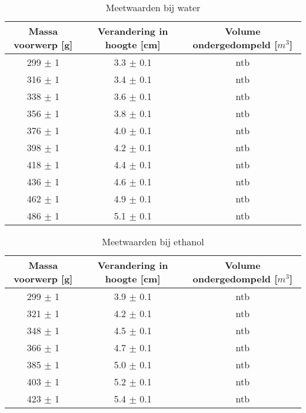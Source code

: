\documentclass[10pt,a4paper,twoside]{article}
\begin{document}
\begin{table}
	\begin{center}
		\caption{Meetwaarden bij water}
		\label{Tabel1}
		\begin{tabular}{|c|c|c|}
			\hline
			Massa voorwerp [g] & Verandering in hoogte [cm] & Volume ondergedompeld [$m^3$]\\
			\hline
			299 $\pm$ 1 & 3.3 $\pm$ 0.1 & ntb\\
			\hline
			316 $\pm$ 1 & 3.4 $\pm$ 0.1 & ntb\\
			\hline
			338 $\pm$ 1 & 3.6 $\pm$ 0.1 & ntb\\
			\hline
			356 $\pm$ 1 & 3.8 $\pm$ 0.1 & ntb\\
			\hline
			376 $\pm$ 1 & 4.0 $\pm$ 0.1 & ntb\\
			\hline
			398 $\pm$ 1 & 4.2 $\pm$ 0.1 & ntb\\
			\hline
			418 $\pm$ 1 & 4.4 $\pm$ 0.1 & ntb\\
			\hline
			436 $\pm$ 1 & 4.6 $\pm$ 0.1 & ntb\\
			\hline
			462 $\pm$ 1 & 4.9 $\pm$ 0.1 & ntb\\
			\hline
			486 $\pm$ 1 & 5.1 $\pm$ 0.1 & ntb\\
			\hline
		\end{tabular}
	\end{center}
\end{table}

\begin{table}
	\begin{center}
		\caption{Meetwaarden bij ethanol}
		\label{Tabel2}
		\begin{tabular}{|c|c|c|}
			\hline
			Massa voorwerp [g] & Verandering in hoogte [cm] & Volume ondergedompeld [$m^3$]\\
			\hline
			299 $\pm$ 1 & 3.9 $\pm$ 0.1 & ntb\\
			\hline
			321 $\pm$ 1 & 4.2 $\pm$ 0.1 & ntb\\
			\hline
			348 $\pm$ 1 & 4.5 $\pm$ 0.1 & ntb\\
			\hline
			366 $\pm$ 1 & 4.7 $\pm$ 0.1 & ntb\\
			\hline
			385 $\pm$ 1 & 5.0 $\pm$ 0.1 & ntb\\
			\hline
			403 $\pm$ 1 & 5.2 $\pm$ 0.1 & ntb\\
			\hline
			423 $\pm$ 1 & 5.4 $\pm$ 0.1 & ntb\\
			\hline
		\end{tabular}
	\end{center}
\end{table}
\end{document}
